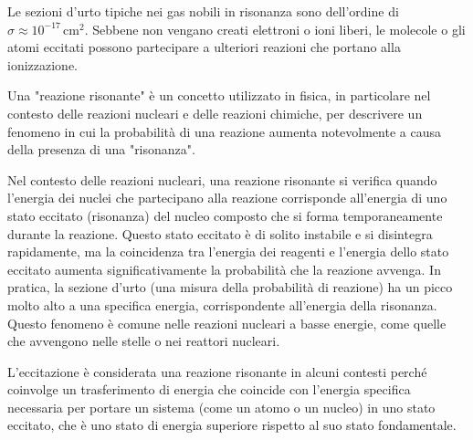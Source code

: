 Le sezioni d'urto tipiche nei gas nobili in risonanza sono dell'ordine di $\sigma \approx 10^{-17} \, \text{cm}^2$. Sebbene non vengano creati elettroni o ioni liberi, le molecole o gli atomi eccitati possono partecipare a ulteriori reazioni che portano alla ionizzazione.

\begin{approfondimento}
   \footnotesize
   Una "reazione risonante" è un concetto utilizzato in fisica, in particolare nel contesto delle reazioni nucleari e delle reazioni chimiche, per descrivere un fenomeno in cui la probabilità di una reazione aumenta notevolmente a causa della presenza di una "risonanza".
   
   Nel contesto delle reazioni nucleari, una reazione risonante si verifica quando l'energia dei nuclei che partecipano alla reazione corrisponde all'energia di uno stato eccitato (risonanza) del nucleo composto che si forma temporaneamente durante la reazione. Questo stato eccitato è di solito instabile e si disintegra rapidamente, ma la coincidenza tra l'energia dei reagenti e l'energia dello stato eccitato aumenta significativamente la probabilità che la reazione avvenga. In pratica, la sezione d'urto (una misura della probabilità di reazione) ha un picco molto alto a una specifica energia, corrispondente all'energia della risonanza. Questo fenomeno è comune nelle reazioni nucleari a basse energie, come quelle che avvengono nelle stelle o nei reattori nucleari.

   L'eccitazione è considerata una reazione risonante in alcuni contesti perché coinvolge un trasferimento di energia che coincide con l'energia specifica necessaria per portare un sistema (come un atomo o un nucleo) in uno stato eccitato, che è uno stato di energia superiore rispetto al suo stato fondamentale.


\end{approfondimento}
